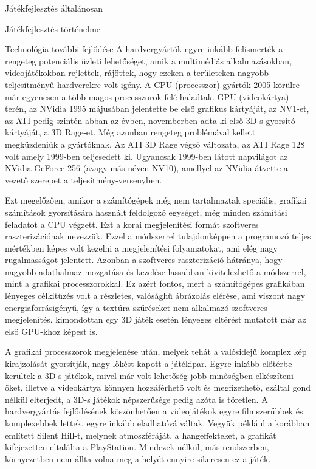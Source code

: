 \begin{MyChapter}{Játékfejlesztés általánosan}
\begin{MySection}{Játékfejlesztés történelme}
		\begin{MySubSection}{Technológia további fejlődése}
			A hardvergyártók egyre inkább felismerték a rengeteg potenciális üzleti lehetőséget, amik a multimédiás alkalmazásokban, videojátékokban rejlettek, rájöttek, hogy ezeken a területeken nagyobb teljesítményű hardverekre volt igény.
			A CPU (processzor) gyártók 2005 körülre már egyenesen a több magos processzorok felé haladtak. 
			GPU (videokártya) terén, az NVidia 1995 májusában jelentette be első grafikus kártyáját, az NV1-et, az ATI pedig szintén abban az évben, novemberben adta ki első 3D-s gyorsító kártyáját, a 3D Rage-et. Még azonban rengeteg problémával kellett megküzdeniük a gyártóknak. Az ATI 3D Rage végső változata, az ATI Rage 128 volt amely 1999-ben teljesedett ki. Ugyancsak 1999-ben látott napvilágot az NVidia GeForce 256 (avagy más néven NV10), amellyel az NVidia átvette a vezető szerepet a teljesítmény-versenyben.
			\cite{gpu_history}
			\cite{ati}
			\cite{nvidia}
		
			Ezt megelőzően, amikor a számítógépek még nem tartalmaztak speciális, grafikai számítások gyorsítására használt feldolgozó egységet, még minden számítási feladatot a CPU végzett. Ezt a korai megjelenítési formát szoftveres raszterizációnak nevezzük. Ezzel a módszerrel tulajdonképpen a programozó teljes mértékben képes volt kezelni a megjelenítési folyamatokat, ami elég nagy rugalmasságot jelentett.
			Azonban a szoftveres raszterizáció hátránya, hogy nagyobb adathalmaz mozgatása és kezelése lassabban kivitelezhető a módszerrel, mint a grafikai processzorokkal.
			Ez azért fontos, mert a számítógépes grafikában lényeges célkitűzés volt a részletes, valósághű ábrázolás elérése, ami viszont nagy energiaforrásigényű, így a textúra szűréseket nem alkalmazó szoftveres megjelenítés, kimondottan egy 3D játék esetén lényeges eltérést mutatott már az első GPU-khoz képest is. \cite{mileff}
		
			A grafikai processzorok megjelenése után, melyek tehát a valósidejű komplex kép kirajzolását gyorsítják, nagy lökést kapott a játékipar. Egyre inkább előtérbe kerültek a 3D-s játékok, mivel már volt lehetőség jobb minőségben elkészíteni őket, illetve a videokártya könnyen hozzáférhető volt és megfizethető, ezáltal gond nélkül elterjedt, a 3D-s játékok népszerűsége pedig azóta is töretlen.
			A hardvergyártás fejlődésének köszönhetően a videojátékok egyre filmszerűbbek és komplexebbek lettek, egyre inkább eladhatóvá váltak. Vegyük például a korábban említett Silent Hill-t, melynek atmoszféráját, a hangeffekteket, a grafikát kifejezetten eltalálta a PlayStation. Mindezek nélkül, más rendszerben, környezetben nem állta volna meg a helyét ennyire sikeresen ez a játék.
		

\end{MySubSection}
\end{MySection}
\end{MyChapter}
